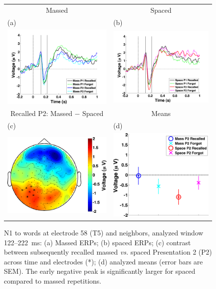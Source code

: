 \begin{figure}[hp]
  \centering
  \begin{tabular}{cc}
  Massed & Spaced \\
  \multicolumn{1}{l}{(a)} & \multicolumn{1}{l}{(b)} \\
  \includegraphics[width=.35\textwidth]{./figs/exp1/tla_single_ga_word_RgH_rc_mass_p1_word_RgH_fo_mass_p1_word_RgH_rc_mass_p2_word_RgH_fo_mass_p2_E50_E51_E57_E58_E59_E64_E65_-200_1000_legend_xylabel} &
  \includegraphics[width=.35\textwidth]{./figs/exp1/tla_single_ga_word_RgH_rc_spac_p1_word_RgH_fo_spac_p1_word_RgH_rc_spac_p2_word_RgH_fo_spac_p2_E50_E51_E57_E58_E59_E64_E65_-200_1000_legend_xylabel} \\
  Recalled P2: Massed $-$ Spaced & Means \\
  \multicolumn{1}{l}{(c)} & \multicolumn{1}{l}{(d)} \\
  \includegraphics[width=.29\textwidth]{./figs/exp1/tla_topocont_ga_word_RgH_rc_mass_p2vsword_RgH_rc_spac_p2_E50_E51_E57_E58_E59_E64_E65_122_222_-2p0_2p0_cb} &
  \includegraphics[width=.30\textwidth]{./figs/exp1/tla_line_ga_word_RgH_rc_mass_p2_word_RgH_fo_mass_p2_word_RgH_rc_spac_p2_word_RgH_fo_spac_p2_E50_E51_E57_E58_E59_E64_E65_122_222_ylabel} \\
  \end{tabular}
  \caption{N1 to words at electrode 58 (T5) and neighbors, analyzed window 122--222~ms: (a) Massed ERPs; (b) spaced ERPs; (c) contrast between subsequently recalled massed \textit{vs.} spaced Presentation 2 (P2) across time and electrodes (*); (d) analyzed means (error bars are SEM).  The early negative peak is significantly larger for spaced compared to massed repetitions.}
  \label{fig:N1}
\end{figure}


